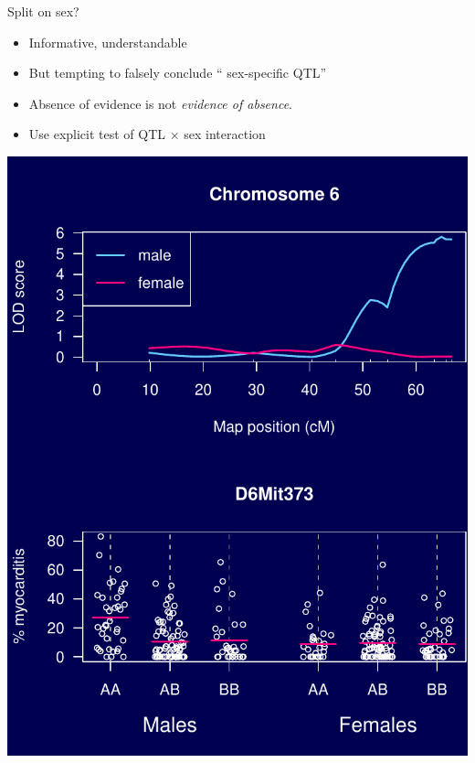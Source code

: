 \documentclass[12pt]{article}
\newcommand{\headsize}{\fontsize{35}{35} \selectfont}
\newcommand{\smallsize}{\fontsize{25}{30} \selectfont}
\newcommand{\smallersize}{\fontsize{20}{25} \selectfont}
\begin{document}
\newpage

\headsize \color{myyellow}
\hfill \begin{minipage}{5.75in}
\centering
Split on sex?
\end{minipage}

\vspace{15mm}

\color{mywhite} \smallsize

\hspace*{0.5in}
\begin{minipage}[t]{4.1in}
\vspace*{25mm}

\sloppy
\smallersize
\begin{itemize}
\setlength{\rightskip}{0pt plus 1fil} %
\item Informative, understandable
\item But tempting to falsely conclude
  ``{\color{mypink} sex-specific QTL}''
\item Absence of evidence {\color{mypink} is not}
  \emph{evidence of absence}.
\item Use explicit test of QTL $\times$ sex interaction
\end{itemize}
\end{minipage}
\hfill
\begin{minipage}[t]{5.3in}
\vspace*{0mm}

\includegraphics{Figs/covar.pdf}
\end{minipage}
\end{document}
